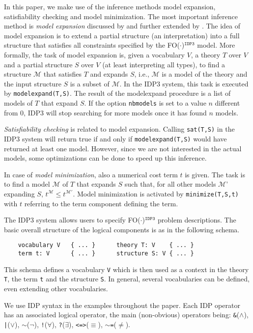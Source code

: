 \documentclass{tlp}
\newcommand{\code}[1]{{\tt #1}}
\newcommand{\idpdrie}{{\sc IDP3}\xspace}
\newcommand{\fodotidp}{{\sc FO($\cdot$)$^{\mathtt{IDP3}}$}\xspace}
\renewcommand{\|}{\ensuremath{\,|\,}}
\newcommand{\model}{\ensuremath{\mathcal{M}}\xspace}
\newcommand{\comment}[1]{\textcolor{red}{#1}}
\renewcommand{\|}{\,|\,}
\newcommand{\idpcode}[1]{\lstinline{#1}}
\begin{document}
In this paper, we make use of the inference methods {model expansion},
{satisfiability checking} and {model minimization}.  The most
important inference method is \emph{model expansion} discussed by
 and further extended by .  The
idea of model expansion is to extend a partial structure (an
interpretation) into a full structure that satisfies all constraints
specified by the \fodotidp model. More formally, the task of model
expansion is, given a vocabulary $V$, a theory $T$ over $V$ and a
partial structure $S$ over $V$ (at least interpreting all types), to
find a structure \model that satisfies $T$ and expands $S$, i.e.,
\model is a model of the theory and the input structure $S$ is a
subset of \model.  In the \idpdrie system, this task is executed by
\idpcode{modelexpand(T,S)}. The result of the modelexpand procedure is
a list of models of $T$ that expand $S$. If the option
\idpcode{nbmodels} is set to a value $n$ different from $0$, \idpdrie will
stop searching for more models once it has found $n$
models.

{\em Satisfiability checking} is related to model
expansion. Calling \idpcode{sat(T,S)} in the \idpdrie system will
return true if and only if \idpcode{modelexpand(T,S)} would have
returned at least one model. However, since we are not interested in
the actual models, some optimizations can be done to speed up this
inference.

In case of {\em model minimization}, also a numerical cost term $t$ is
given. The task is to find a model \model of $T$ that expands $S$ such
that, for all other models \model' expanding $S$, $t^{\model} \leq
t^{\model'}$. Model minimization is activated by
\idpcode{minimize(T,S,t)} with $t$ referring to the term component
defining the term.

The \idpdrie system allows users to specify \fodotidp problem
descriptions. The basic overall structure of the logical components is
as in the following schema.
\begin{lstlisting}
	vocabulary V   { ... }  	theory T: V    { ... }
	term t: V      { ... }  	structure S: V { ... }
\end{lstlisting}
This schema defines a vocabulary \idpcode{V} which is then used as a
context in the theory \idpcode{T}, the term \idpcode{t} and the
structure \idpcode{S}. In general, several vocabularies can be
defined, even extending other vocabularies.

We use IDP syntax in the examples throughout the paper. Each IDP
operator has an associated logical operator, the main (non-obvious)
operators being: \code{\&}($\land$), \code{|}($\lor$),
$\sim$($\lnot$), \code{!}($\forall$), \code{?}($\exists$),
\code{<=>}($\equiv$), $\sim$\code{=}($\neq$).
\end{document}
